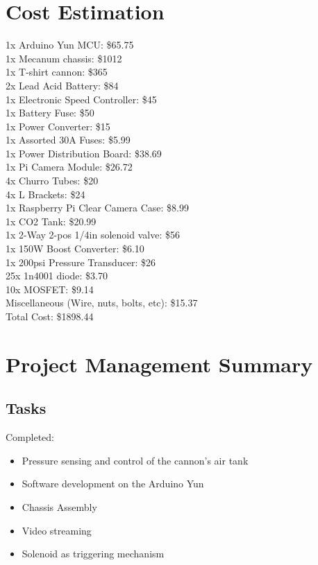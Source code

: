 \documentclass[letterpaper,12pt]{article}
\begin{document}
\section{Cost Estimation}
1x Arduino Yun MCU: \$65.75 \\
1x Mecanum chassis: \$1012 \\
1x T-shirt cannon: \$365 \\
2x Lead Acid Battery: \$84 \\
1x Electronic Speed Controller: \$45 \\
1x Battery Fuse: \$50 \\
1x Power Converter: \$15 \\
1x Assorted 30A Fuses: \$5.99 \\ 
1x Power Distribution Board: \$38.69 \\
1x Pi Camera Module: \$26.72 \\  
4x Churro Tubes: \$20 \\
4x L Brackets: \$24 \\
1x Raspberry Pi Clear Camera Case: \$8.99 \\
1x CO2 Tank: \$20.99 \\
1x 2-Way 2-pos 1/4in solenoid valve: \$56 \\
1x 150W Boost Converter: \$6.10 \\
1x 200psi Pressure Transducer: \$26 \\
25x 1n4001 diode: \$3.70 \\
10x MOSFET: \$9.14 \\

Miscellaneous (Wire, nuts, bolts, etc): \$15.37 \\

Total Cost: \$1898.44

\section{Project Management Summary}

\subsection{Tasks}
\noindent Completed:
\begin{itemize}
    \item Pressure sensing and control of the cannon's air tank
    \item Software development on the Arduino Yun
    \item Chassis Assembly
    \item Video streaming
    \item Solenoid as triggering mechanism
\end{itemize} 
\end{document}
